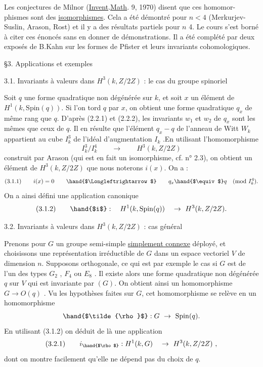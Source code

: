 
Les conjectures de Milnor (\uline{Invent}.\uline{Math}. 9, 1970) disent que ces homomor-%
phismes sont des \uline{isomorphismes}. Cela a été démontré pour $n < 4$ (Merkurjev-%
Suslin, Arason, Rost) et il y a des résultats partiels pour $n$ \hand{$\geqslant$} 4.
Le cours s'est borné à citer ces énoncés sans en donner de démonstrations.
Il a été complété par deux exposés de B.Kahn sur les formes de Pfister
et leurs invariants cohomologiques.

§3. Applications et exemples

3.1. Invariants à valeurs dans $H^3(k, Z/2Z)$ : le cas du groupe spinoriel

Soit $q$ une forme quadratique non dégénérée sur $k$, et soit $x$ un
élément de $H^1(k, \mathrm{Spin}(q))$. Si l'on tord $q$ par $x$, on obtient une forme
quadratique $q_x$ de même rang que $q$. D'après (2.2.1) et (2.2.2), les
invariants $w_1$ et $w_2$ de $q_x$ sont les mêmes que ceux de $q$. Il en résulte que
l'élément $q_x - q$ de l'anneau de Witt $W_k$ appartient au cube $I_k^3$ de
l'idéal d'augmentation $I_k$ .En utilisant l'homomorphisme
\[ I_k^3/I_k^4 \qquad \to \qquad H^3(k, Z/2Z) \]
construit par Arason (qui est en fait un isomorphisme, cf. n° 2.3), on
obtient un élément de $H^3(k, Z/2Z)$ que nous noterons $i(x)$. On a :
\[ (3.1.1) \qquad i(x) = 0 \qquad \hand{$\Longleftrightarrow$} \qquad q_x \hand{$\equiv$} q \quad (\mathrm{mod}\ I_k^4). \]
On a ainsi défini une application canonique
\[ (3.1.2) \qquad \hand{$i$} : \quad H^1(k, \mathrm{Spin}(q)) \quad \to \ H^3(k, Z/2Z). \]

3.2. Invariants à valeurs dans $H^3(k, Z/2Z)$ : cas général

Prenons pour $G$ un groupe semi-simple \uline{simplement connexe} déployé,
et choisissons une représentation irréductible \hand{$\rho$} de $G$ dans un
espace vectoriel $V$ de dimension $n$. Supposons \hand{$\rho$} orthogonale, ce qui
est par exemple le cas si $G$ est de l'un des types $G_2$ , $F_4$ ou $E_8$ . Il existe
alors une forme quadratique non dégénérée $q$ sur $V$ qui est invariante
par \hand{$\rho$}$(G)$. On obtient ainsi un homomorphisme $G \to O(q)$ . Vu
les hypothèses faites sur $G$, cet homomorphisme se relève en un homomorphisme
\[ \hand{$\tilde{\rho}$} : G \ \to \ \mathrm{Spin}(q). \]
En utilisant (3.1.2) on déduit de là une application
\[ (3.2.1) \qquad i_{\hand{$\rho$}} : H^1(k, G) \quad \to \ H^3(k, Z/2Z) \ , \]
dont on montre facilement qu'elle ne dépend pas du choix de $q$.

